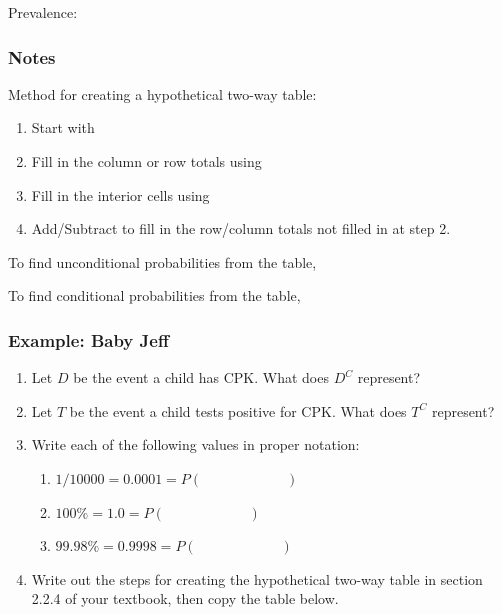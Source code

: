 \documentclass[
]{report}
\providecommand{\tightlist}{%
  \setlength{\itemsep}{0pt}\setlength{\parskip}{0pt}}
\newcommand{\rgs}{\vspace{12pt}} %
\newcommand{\rgi}{\hspace{24pt}}  %
\begin{document}
Prevalence:
\rgs

\hypertarget{notes-5}{%
\subsubsection*{Notes}\label{notes-5}}

Method for creating a hypothetical two-way table:

\begin{enumerate}
\def\labelenumi{\arabic{enumi}.}
\item
  Start with
  \rgs
\item
  Fill in the column or row totals using
  \rgs
\item
  Fill in the interior cells using
  \rgs
\item
  Add/Subtract to fill in the row/column totals not filled in at step 2.
\end{enumerate}

\rgi \rgi To find unconditional probabilities from the table,
\rgs

\rgi \rgi To find conditional probabilities from the table,
\rgs

\hypertarget{example-baby-jeff}{%
\subsubsection*{Example: Baby Jeff}\label{example-baby-jeff}}

\begin{enumerate}
\def\labelenumi{\arabic{enumi}.}
\item
  Let \(D\) be the event a child has CPK. What does \(D^C\) represent?
  \rgs
\item
  Let \(T\) be the event a child tests positive for CPK. What does \(T^C\) represent?
  \rgs
\item
  Write each of the following values in proper notation:

  \begin{enumerate}
  \def\labelenumii{\alph{enumii}.}
  \tightlist
  \item
    \(1/10000 = 0.0001 = P( \hspace{1in} )\)\\
  \item
    \(100\% = 1.0 = P( \hspace{1in} )\)\\
  \item
    \(99.98\% = 0.9998 = P( \hspace{1in} )\)
  \end{enumerate}
\item
  Write out the steps for creating the hypothetical two-way table in section 2.2.4 of your textbook, then copy the table below.
\end{enumerate}
\end{document}
